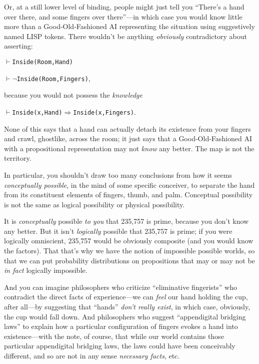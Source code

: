 {
 Or, at a still lower level of binding, people might just tell you
``There's a hand over there, and some
fingers over there''---in which case you would know
little more than a Good-Old-Fashioned AI representing the situation
using suggestively named LISP tokens. There wouldn't be
anything \textit{obviously} contradictory about asserting:}


$\vdash$\texttt{Inside(Room,Hand)}

$\vdash\lnot$\texttt{Inside(Room,Fingers)},

{
 because you would not possess the \textit{knowledge}}

 $\vdash$\texttt{Inside(x,Hand)$\Rightarrow $Inside(x,Fingers)}.

{
 None of this says that a hand can actually detach its existence
from your fingers and crawl, ghostlike, across the room; it just says
that a Good-Old-Fashioned AI with a propositional representation may
not \textit{know} any better. The map is not the territory.}

{
 In particular, you shouldn't draw too many
conclusions from how it seems \textit{conceptually possible}, in the
mind of some specific conceiver, to separate the hand from its
constituent elements of fingers, thumb, and palm. Conceptual
possibility is not the same as logical possibility or physical
possibility.}

{
 It is \textit{conceptually} possible \textit{to you} that 235,757
is prime, because you don't know any better. But it
isn't \textit{logically} possible that 235,757 is
prime; if you were logically omniscient, 235,757 would be obviously
composite (and you would know the factors). That that's
why we have the notion of impossible possible worlds, so that we can
put probability distributions on propositions that may or may not be
\textit{in fact} logically impossible.}

{
 And you can imagine philosophers who criticize
``eliminative fingerists'' who
contradict the direct facts of experience---we can \textit{feel} our
hand holding the cup, after all---by suggesting that
``hands''
\textit{don't really exist}, in which case, obviously,
the cup would fall down. And philosophers who suggest
``appendigital bridging laws'' to
explain how a particular configuration of fingers evokes a hand into
existence---with the note, of course, that while our world contains
those particular appendigital bridging laws, the laws could have been
conceivably different, and so are not in any sense \textit{necessary
facts}, etc.}

